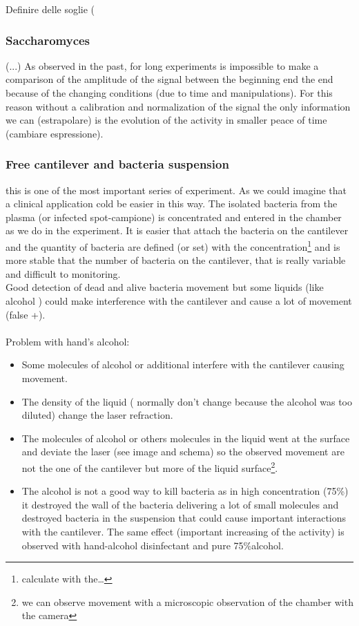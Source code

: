 \documentclass[11pt, a4paper]{article}
\begin{document}
Definire delle soglie (%

\subsubsection{Saccharomyces}%
    (...)
As observed in the past, for long experiments is impossible to make a comparison of the amplitude of the signal between the beginning end the end because of the changing conditions (due to time and manipulations). For this reason without a calibration and normalization of the signal the only information we can (estrapolare) is the evolution of the activity in smaller peace of time (cambiare espressione).

\subsubsection{Free cantilever and bacteria suspension} %
    this is one of the most important series of experiment. As we could imagine that a clinical application cold be easier in this way. The isolated bacteria from the plasma (or infected spot-campione) is concentrated and entered in the chamber as we do in the experiment. It is easier that attach the bacteria on the cantilever and the quantity of bacteria are defined (or set) with the concentration\footnote{calculate with the…} and is more stable that the number of bacteria on the cantilever, that is really variable and difficult to monitoring. \\
Good detection of dead and alive bacteria movement but some liquids (like alcohol ) could make interference with the cantilever and cause a lot of movement (false +).
\\
\\
Problem with hand's alcohol:
\begin{itemize}
\item{Some molecules of alcohol or additional interfere with the cantilever causing movement.} 
\item{The density of the liquid ( normally don’t change because the alcohol was too diluted) change the laser refraction.}
\item{The molecules of alcohol or others molecules in the liquid went at the surface and deviate the laser (see image and schema) so the observed movement are not the one of the cantilever but more of the liquid surface\footnote{we can observe movement with a microscopic observation of the chamber with the camera}.}
\item{The alcohol is not a good way to kill bacteria as in high concentration (75\%) it destroyed the wall of the bacteria delivering a lot of small molecules and destroyed bacteria in the suspension that could cause important interactions with the cantilever. The same effect (important increasing of the activity) is observed with hand-alcohol disinfectant and pure 75\%alcohol.}
\end{itemize}
\end{document}
